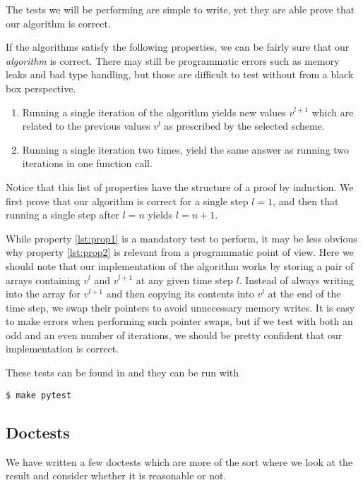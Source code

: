 The tests we will be performing are simple to write, yet they are able prove that our algorithm is correct.

If the algorithms satisfy the following properties, we can be fairly sure that our \emph{algorithm} is correct. There may still be programmatic errors such as memory leaks and bad type handling, but those are difficult to test without from a black box perspective.
\begin{enumerate}[label=(\roman*)]
    \item Running a single iteration of the algorithm yields new values $v^{l+1}$ which are related to the previous values $v^l$ as prescribed by the selected scheme. \label{lst:prop1}
    \item Running a single iteration two times, yield the same answer as running two iterations in one function call.\label{lst:prop2}
\end{enumerate}

Notice that this list of properties have the structure of a proof by induction. We first prove that our algorithm is correct for a single step $l = 1$, and then that running a single step after $l = n$ yields $l = n+1$.

While property \ref{lst:prop1} is a mandatory test to perform, it may be less obvious why property \ref{lst:prop2} is relevant from a programmatic point of view. Here we should note that our implementation of the algorithm works by storing a pair of arrays containing $v^l$ and $v^{l+1}$ at any given time step $l$. Instead of always writing into the array for $v^{l+1}$ and then copying its contents into $v^l$ at the end of the time step, we swap their pointers to avoid unnecessary memory writes. It is easy to make errors when performing such pointer swaps, but if we test with both an odd and an even number of iterations, we should be pretty confident that our implementation is correct.

These tests can be found in  and they can be run with

\begin{verbatim}
$ make pytest
\end{verbatim}

\subsection{Doctests}
\label{appx:testing:doctests}
We have written a few doctests which are more of the sort where we look at the result and consider whether it is reasonable or not.

